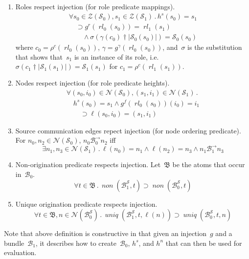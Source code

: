 \documentclass[12pt]{article}
\newcommand{\fn}[1]{\ensuremath{\operatorname{\mathit{#1}}}}
\newcommand{\prefix}[2]{#1\dagger#2}
\newcommand{\all}[1]{\forall#1\mathpunct.}
\newcommand{\some}[1]{\exists#1\mathpunct.}
\newcommand{\alg}[1]{\ensuremath{\mathfrak{#1}}}
\newcommand{\atm}{\alg{B}}
\newcommand{\ssp}{\ensuremath{\mathcal{S}}}
\newcommand{\bun}{\ensuremath{\mathcal{B}}}
\newcommand{\strands}{\ensuremath{\mathcal{Z}}}
\newcommand{\nodes}{\ensuremath{\mathcal{N}}}
\newcommand{\rl}{\fn{rl}}
\begin{document}
\begin{enumerate}

\item\label{item: role mappings} Roles respect injection (for role
  predicate mappings).
  \[\begin{array}{l}
  \all{s_0\in\strands(\ssp_0),s_1\in\strands(\ssp_1)}h^s(s_0) = s_1\\
  \quad\supset g^r(\rl_0(s_0))=\rl_1(s_1)\\
  \qquad{}\land\sigma(\prefix{\gamma(c_0)}{|\ssp_0(s_0)|})
  = \ssp_0(s_0)
  \end{array}\]
  where $c_0=\rho^c(\rl_0(s_0))$,
  $\gamma=g^\gamma(\rl_0(s_0))$, and~$\sigma$ is the substitution that
  shows that~$s_1$ is an instance of its role, i.e.\@
  $\sigma(\prefix{c_1}{|\ssp_1(s_1)|})=\ssp_1(s_1)$ for
  $c_1=\rho^c(\rl_1(s_1))$.

\item\label{item: role heights} Nodes respect injection (for role
  predicate heights).
  \[\begin{array}{l}
  \all{(s_0,i_0)\in\nodes(\ssp_0),(s_1,i_1)\in\nodes(\ssp_1)}\\
  \quad h^s(s_0) = s_1\land g^f(\rl_0(s_0))(i_0)=i_1\\
  \qquad{}\supset\ell(s_0,i_0)=(s_1,i_1)
  \end{array}\]

\item\label{item: node orderings} Source communication edges repect
  injection (for node ordering predicate).  For
  $n_0,n_2\in\nodes(\ssp_0)$, $n_0\mathbin{\bun^\to_0} n_2$ iff
  \[\some{n_1,n_3\in\nodes(\ssp_1)}\ell(n_0)=n_1\land\ell(n_2)=n_3\land
  n_1\mathbin{\bun^\to_1} n_3\]

\item\label{item: nons} Non-origination predicate respects injection.
  Let~$\atm$ be the atoms that occur in~$\bun_0$.
  \[\all{t\in\atm}\fn{non}(\bun_1^\ssp, t)\supset\fn{non}(\bun_0^\ssp, t)\]

\item\label{item: uniques} Unique origination predicate respects injection.
  \[\all{t\in\atm,n\in\nodes(\bun_0^\ssp)}\fn{uniq}(\bun_1^\ssp,
  t,\ell(n))\supset\fn{uniq}(\bun_0^\ssp, t,n)\]
\end{enumerate}

Note that above definition is constructive in that given an
injection~$g$ and a bundle~$\bun_1$, it describes how to
create~$\bun_0$, $h^s$, and $h^n$ that can then be used for
evaluation.



\end{document}
